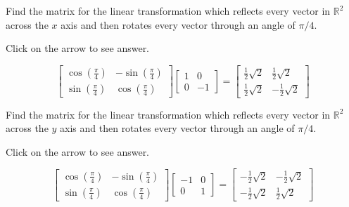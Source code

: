 \documentclass{ximera}
\begin{document}
\begin{problem}\label{prb:6.20} Find the matrix for the linear transformation which reflects every
vector in $\mathbb{R}^{2}$ across the $x$ axis and then rotates every vector
through an angle of $\pi /4$.

Click on the arrow to see answer.
\begin{expandable}
\[
\left[
\begin{array}{cc}
\cos \left( \frac{\pi }{4}\right)  & -\sin \left( \frac{\pi }{4}\right)  \\
\sin \left( \frac{\pi }{4}\right)  & \cos \left( \frac{\pi }{4}\right)
\end{array}
\right] \left[
\begin{array}{rr}
1 & 0 \\
0 & -1
\end{array}
\right] = \left[
\begin{array}{cc}
\frac{1}{2}\sqrt{2} & \frac{1}{2}\sqrt{2} \\
\frac{1}{2}\sqrt{2} & -\frac{1}{2}\sqrt{2}
\end{array}
\right]
\]
\end{expandable}
\end{problem}

\begin{problem}\label{prb:6.21} Find the matrix for the linear transformation which reflects every
vector in $\mathbb{R}^{2}$ across the $y$ axis and then rotates every vector
through an angle of $\pi /4$.

Click on the arrow to see answer.
\begin{expandable}
\[
\left[
\begin{array}{cc}
\cos \left( \frac{\pi }{4}\right)  & -\sin \left( \frac{\pi }{4}\right)  \\
\sin \left( \frac{\pi }{4}\right)  & \cos \left( \frac{\pi }{4}\right)
\end{array}
\right] \left[
\begin{array}{rr}
-1 & 0 \\
0 & 1
\end{array}
\right] = \left[
\begin{array}{cc}
-\frac{1}{2}\sqrt{2} & -\frac{1}{2}\sqrt{2} \\
-\frac{1}{2}\sqrt{2} & \frac{1}{2}\sqrt{2}
\end{array}
\right]
\]
\end{expandable}
\end{problem}
\end{document}
